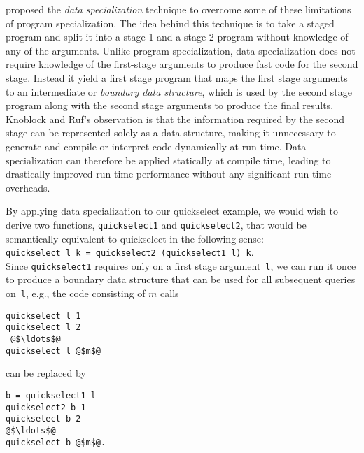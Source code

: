 \cite{knoblock96} proposed the {\em data specialization}
technique to overcome some of these limitations of program
specialization.  The idea behind this technique is to take a staged
program and split it into a stage-1 and a stage-2 program without
knowledge of any of the arguments.  Unlike program specialization,
data specialization does not require knowledge of the first-stage
arguments to produce fast code for the second stage.  Instead it yield
a first stage program that maps the first stage arguments to an
intermediate or {\em boundary data structure}, which is used by the
second stage program along with the second stage arguments to produce
the final results.  Knoblock and Ruf's observation is that the
information required by the second stage can be represented solely as
a data structure, making it unnecessary to generate and compile or
interpret code dynamically at run time.  Data specialization can
therefore be applied statically at compile time, leading to
drastically improved run-time performance without any significant
run-time overheads.


By applying data specialization to our quickselect example, we would
wish to derive two functions, \texttt{quickselect1} and
\texttt{quickselect2}, that would be semantically equivalent to
quickselect in the following sense:
\\
\texttt{quickselect l k = quickselect2 (quickselect1 l) k}.
\\
%
Since \texttt{quickselect1} requires only on a first stage
argument~\texttt{l}, we can run it once to produce a boundary data
structure that can be used for all subsequent queries on~\texttt{l},
e.g.,  the code consisting of $m$ calls 
\begin{lstlisting}
quickselect l 1
quickselect l 2
 @$\ldots$@ 
quickselect l @$m$@
\end{lstlisting}
%
can be replaced by 
%
\begin{lstlisting}
b = quickselect1 l
quickselect2 b 1
quickselect b 2
@$\ldots$@ 
quickselect b @$m$@.
\end{lstlisting}

